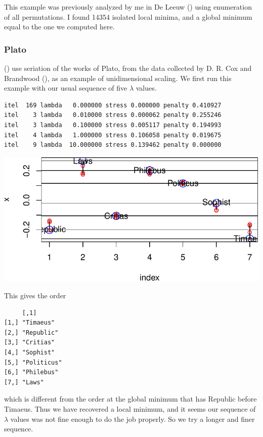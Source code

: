 \documentclass[
  12pt,
  letterpaper,
  DIV=11,
  numbers=noendperiod]{scrreprt}
\theoremstyle{remark}
\begin{document}
This example was previously analyzed by me in De Leeuw
() using enumeration of all
permutations. I found 14354 isolated local minima, and a global minimum
equal to the one we computed here.

\subsubsection{Plato}\label{plato}

()
use seriation of the works of Plato, from the data collected by D. R.
Cox and Brandwood (), as an example
of unidimensional scaling. We first run this example with our usual
sequence of five \(\lambda\) values.

\begin{verbatim}
itel  169 lambda   0.000000 stress 0.000000 penalty 0.410927 
itel    3 lambda   0.010000 stress 0.000062 penalty 0.255246 
itel    3 lambda   0.100000 stress 0.005117 penalty 0.194993 
itel    4 lambda   1.000000 stress 0.106058 penalty 0.019675 
itel    9 lambda  10.000000 stress 0.139462 penalty 0.000000 
\end{verbatim}

\begin{center}
\includegraphics{global_files/figure-pdf/plato-1.pdf}
\end{center}

This gives the order

\begin{verbatim}
     [,1]       
[1,] "Timaeus"  
[2,] "Republic" 
[3,] "Critias"  
[4,] "Sophist"  
[5,] "Politicus"
[6,] "Philebus" 
[7,] "Laws"     
\end{verbatim}

which is different from the order at the global minimum that has
Republic before Timaeus. Thus we have recovered a local minimum, and it
seems our sequence of \(\lambda\) values was not fine enough to do the
job properly. So we try a longer and finer sequence.
\end{document}
